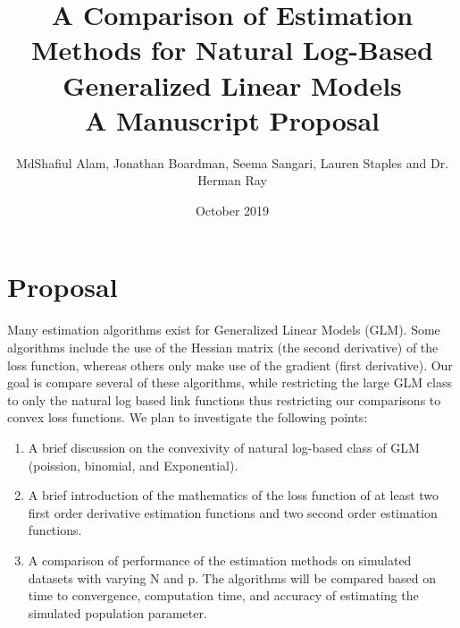 \documentclass{article}
\begin{document}
\title{A Comparison of Estimation Methods for Natural Log-Based Generalized Linear Models\\
    \large A Manuscript Proposal}
\author{MdShafiul Alam, Jonathan Boardman, Seema Sangari, Lauren Staples and Dr. Herman Ray}
\date{October 2019}
\maketitle

\section{Proposal}
\indent Many estimation algorithms exist for Generalized Linear Models (GLM). Some algorithms include the use of the Hessian matrix (the second derivative) of the loss function, whereas others only make use of the gradient (first derivative). Our goal is compare several of these algorithms, while restricting the large GLM class to only the natural log based link functions thus restricting our comparisons to convex loss functions.  We plan to investigate the following points:

\begin{enumerate}
\item A brief discussion on the convexivity of natural log-based class of GLM (poission, binomial, and Exponential).
\item A brief introduction of the mathematics of the loss function of at least two first order derivative estimation functions and two second order estimation functions.
\item A comparison of performance of the estimation methods on simulated datasets with varying N and p.  The algorithms will be compared based on time to convergence, computation time, and accuracy of estimating the simulated population parameter.
\end{enumerate}
\end{document}
